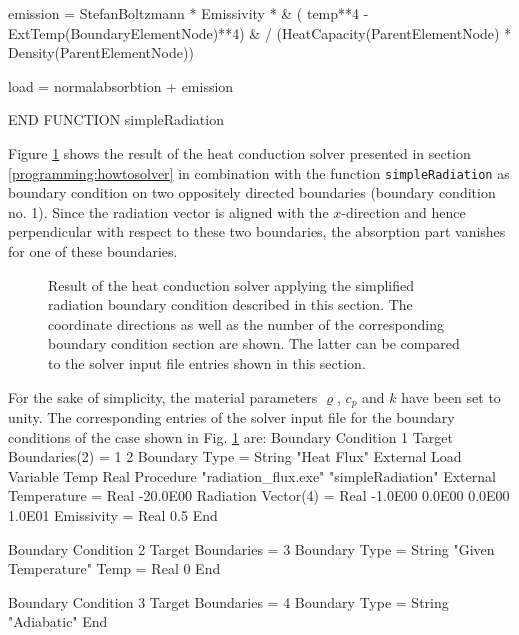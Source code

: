   emission = StefanBoltzmann * Emissivity * &
       ( temp**4 - ExtTemp(BoundaryElementNode)**4) &
       / (HeatCapacity(ParentElementNode) * Density(ParentElementNode))

  load = normalabsorbtion + emission
  
END FUNCTION simpleRadiation
\ttend

Figure \ref{programming:fig:radiation} shows the result of the heat conduction solver presented in section \ref{programming:howtosolver} in combination with the function \texttt{simpleRadiation} as boundary condition on two oppositely directed boundaries (boundary condition no. 1). Since the radiation vector is aligned with the $x$-direction and hence  perpendicular with respect to these two boundaries, the absorption part vanishes for one of these boundaries.
\begin{figure}[tbhp]
\begin{center}
\caption{\label{programming:fig:radiation} Result of the heat conduction solver applying the simplified radiation boundary condition described in this section. The coordinate directions as well as the number of the corresponding boundary condition section are shown. The latter can be compared to the solver input file entries shown in this section.}
\end{center}
\end{figure}
For the sake of simplicity, the material parameters $\varrho$, $c_{p}$ and $k$ have been set to unity. The corresponding entries of the solver input file for the boundary conditions of the case shown in Fig. \ref{programming:fig:radiation} are:
\ttbegin
Boundary Condition 1
  Target Boundaries(2) = 1 2
  Boundary Type = String "Heat Flux"
  External Load  
        Variable Temp
        Real Procedure "radiation_flux.exe" "simpleRadiation"
  External Temperature = Real -20.0E00
  Radiation Vector(4) = Real -1.0E00 0.0E00  0.0E00  1.0E01
  Emissivity = Real 0.5
End

Boundary Condition 2
  Target Boundaries = 3
  Boundary Type = String "Given Temperature"
  Temp = Real 0
End

Boundary Condition 3
  Target Boundaries = 4
  Boundary Type = String "Adiabatic"
End
\ttend

